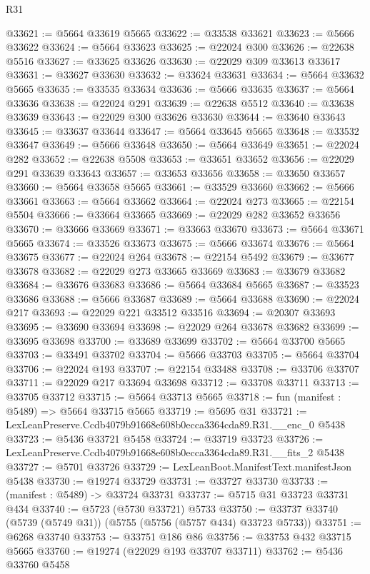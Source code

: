 \begin{lexlean}{R31}
\begin{coremodule}
@33621 := @5664 @33619 @5665
@33622 := @33538 @33621
@33623 := @5666 @33622
@33624 := @5664 @33623
@33625 := @22024 @300
@33626 := @22638 @5516
@33627 := @33625 @33626
@33630 := @22029 @309 @33613 @33617
@33631 := @33627 @33630
@33632 := @33624 @33631
@33634 := @5664 @33632 @5665
@33635 := @33535 @33634
@33636 := @5666 @33635
@33637 := @5664 @33636
@33638 := @22024 @291
@33639 := @22638 @5512
@33640 := @33638 @33639
@33643 := @22029 @300 @33626 @33630
@33644 := @33640 @33643
@33645 := @33637 @33644
@33647 := @5664 @33645 @5665
@33648 := @33532 @33647
@33649 := @5666 @33648
@33650 := @5664 @33649
@33651 := @22024 @282
@33652 := @22638 @5508
@33653 := @33651 @33652
@33656 := @22029 @291 @33639 @33643
@33657 := @33653 @33656
@33658 := @33650 @33657
@33660 := @5664 @33658 @5665
@33661 := @33529 @33660
@33662 := @5666 @33661
@33663 := @5664 @33662
@33664 := @22024 @273
@33665 := @22154 @5504
@33666 := @33664 @33665
@33669 := @22029 @282 @33652 @33656
@33670 := @33666 @33669
@33671 := @33663 @33670
@33673 := @5664 @33671 @5665
@33674 := @33526 @33673
@33675 := @5666 @33674
@33676 := @5664 @33675
@33677 := @22024 @264
@33678 := @22154 @5492
@33679 := @33677 @33678
@33682 := @22029 @273 @33665 @33669
@33683 := @33679 @33682
@33684 := @33676 @33683
@33686 := @5664 @33684 @5665
@33687 := @33523 @33686
@33688 := @5666 @33687
@33689 := @5664 @33688
@33690 := @22024 @217
@33693 := @22029 @221 @33512 @33516
@33694 := @20307 @33693
@33695 := @33690 @33694
@33698 := @22029 @264 @33678 @33682
@33699 := @33695 @33698
@33700 := @33689 @33699
@33702 := @5664 @33700 @5665
@33703 := @33491 @33702
@33704 := @5666 @33703
@33705 := @5664 @33704
@33706 := @22024 @193
@33707 := @22154 @33488
@33708 := @33706 @33707
@33711 := @22029 @217 @33694 @33698
@33712 := @33708 @33711
@33713 := @33705 @33712
@33715 := @5664 @33713 @5665
@33718 := fun (manifest : @5489) => @5664 @33715 @5665
@33719 := @5695 @31
@33721 := LexLeanPreserve.Ccdb4079b91668e608b0ecca3364cda89.R31.__enc_0 @5438
@33723 := @5436 @33721 @5458
@33724 := @33719 @33723
@33726 := LexLeanPreserve.Ccdb4079b91668e608b0ecca3364cda89.R31.__fits_2 @5438
@33727 := @5701 @33726
@33729 := LexLeanBoot.ManifestText.manifestJson @5438
@33730 := @19274 @33729
@33731 := @33727 @33730
@33733 := (manifest : @5489) -> @33724 @33731
@33737 := @5715 @31 @33723 @33731 @434
@33740 := @5723 (@5730 @33721) @5733
@33750 := @33737 @33740 (@5739 (@5749 @31)) (@5755 (@5756 (@5757 @434) @33723 @5733))
@33751 := @6268 @33740
@33753 := @33751 @186 @86
@33756 := @33753 @432 @33715 @5665
@33760 := @19274 (@22029 @193 @33707 @33711)
@33762 := @5436 @33760 @5458

\end{coremodule}
\end{lexlean}

